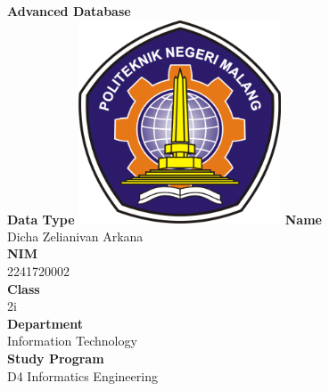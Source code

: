 \documentclass[12pt,titlepage]{article}
\newcommand{\vSubject}{Advanced Database}
\newcommand{\vSubtitle}{Data Type}
\newcommand{\vName}{Dicha Zelianivan Arkana}
\newcommand{\vNIM}{2241720002}
\newcommand{\vClass}{2i}
\newcommand{\vDepartment}{Information Technology}
\newcommand{\vStudyProgram}{D4 Informatics Engineering}
\begin{document}
\begin{titlepage}
    \centering
    \vfill
    {\bfseries\LARGE
        \vSubject\\
        \vskip0.25cm
        \vSubtitle
    }
    \vfill
    \includegraphics[width=6cm]{images/polinema-logo.png}
    \vfill
    {
        \textbf{Name}\\
        \vName\\
        \vskip0.5cm
        \textbf{NIM}\\
        \vNIM\\
        \vskip0.5cm
        \textbf{Class}\\
        \vClass\\
        \vskip0.5cm
        \textbf{Department}\\
        \vDepartment\\
        \vskip0.5cm
        \textbf{Study Program}\\
        \vStudyProgram
    }
\end{titlepage}
\end{document}
